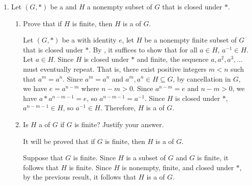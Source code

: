 \begin{enumerate}
\begin{enumerate}
\begin{subprove}
      Therefore, \(H = \{i, f, f g, g f\}\).
      
      Now, it will be checked whether \(H\) is closed under composition.
      From the product table for \(S_{3}\) computed earlier, \(f \cdot (f g) = g\).
      Since \(g^{2} \neq i\), it follows that \(g \notin H\).
      Therefore, \(f \in H\) and \(f g \in H\), but \(f \cdot (f g) = g \notin H\).
      Therefore, \(H\) is not closed under composition.
      
      Since \(H\) is not closed under composition, it follows that \(H\) is not a  of \(S_{3}\).
      
      Therefore, the statement that \(H = \{a \in G \mid a^{2} = e\}\) is a  of \(G\) is false when \(G\) is nonabelian.
    \end{subprove}
  \end{enumerate}
  \item Let \((G, *)\) be a  and \(H\) a nonempty subset of \(G\) that is closed under \(*\).
  \begin{enumerate}
    \item Prove that if \(H\) is finite, then \(H\) is a  of \(G\).
    \begin{subprove}
      Let \((G, *)\) be a  with identity \(e\), let \(H\) be a nonempty finite subset of \(G\) that is closed under \(*\).
      By , it suffices to show that for all \(a \in H\), \(a^{-1} \in H\).
      Let \(a \in H\). Since \(H\) is closed under \(*\) and finite, the sequence \(a, a^{2}, a^{3}, \ldots\) must eventually repeat. That is, there exist positive integers \(m < n\) such that \(a^{m} = a^{n}\).
      Since \(a^{m} = a^{n}\) and \(a^{m}, a^{n} \in H \subseteq G\), by cancellation in \(G\), we have \(e = a^{n-m}\) where \(n - m > 0\).
      Since \(a^{n-m} = e\) and \(n - m > 0\), we have \(a * a^{n-m-1} = e\), so \(a^{n-m-1} = a^{-1}\).
      Since \(H\) is closed under \(*\), \(a^{n-m-1} \in H\), so \(a^{-1} \in H\).
      Therefore, \(H\) is a  of \(G\).
    \end{subprove}
    \item Is \(H\) a  of \(G\) if \(G\) is finite? Justify your answer.
    \begin{subprove}
      It will be proved that if \(G\) is finite, then \(H\) is a  of \(G\).
      
      Suppose that \(G\) is finite.
      Since \(H\) is a subset of \(G\) and \(G\) is finite, it follows that \(H\) is finite.
      Since \(H\) is nonempty, finite, and closed under \(*\), by the previous result, it follows that \(H\) is a  of \(G\).
      

\end{subprove}
\end{enumerate}
\end{enumerate}
